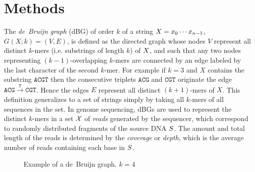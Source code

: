 \documentclass[a4paper,12pt]{article}
\newcommand{\dBG}{de~Bruijn graph\xspace}
\newcommand{\kmer}{\mbox{$k$-mer}\xspace}
\newcommand{\kmers}{\mbox{$k$-mers}\xspace}
\newcommand{\chr}[1]{\ensuremath{\mathtt{#1}}}
\newcommand{\keyterm}[1]{\textit{#1}\/\xspace}
\newcommand{\str}[2]{\ensuremath{#1_0\cdots#1_{#2-1}}}
\newcommand{\strname}[1]{\ensuremath{\uppercase{#1}}}
\newcommand{\strdef}[2]{\ensuremath{\strname{#1}=\str{#1}{#2}}}
\newcommand{\strsetname}[1]{\ensuremath{\mathcal{\uppercase{#1}}}}
\newcommand{\readset}{\strsetname{X}\xspace}
\begin{document}
\section{Methods}

The \keyterm{\dBG} (dBG) of order $k$ of a string \strdef{x}{n}, $G(X;k)=(V,E)$, is defined as the directed graph whose nodes $V$ represent all distinct \kmer{s} (i.e. substrings of length $k$) of \strname{X}, and such that any two nodes representing $(k-1)$-overlapping \kmer{s} are connected by an edge labeled by the last character of the second \kmer. For example if $k=3$ and $X$ contains the substring \chr{ACGT} then the consecutive triplets \chr{ACG} and \chr{CGT} originate the edge $\chr{ACG}\stackrel{\chr{T}}{\longrightarrow}\chr{CGT}$. Hence the edges $E$ represent all distinct $(k+1)$-mers of $X$. This definition  generalizes to a set of strings simply by taking all \kmers of all sequences in the set.
In genome sequencing, dBGs are used to represent the distinct \kmer{s} in a set \readset of \keyterm{reads} generated by the sequencer, which correspond to randomly distributed fragments of the source DNA \strname{S}. The amount and total length of the reads is determined by the \keyterm{coverage} or \keyterm{depth}, which is the average number of reads containing each base in \strname{S}. 

\begin{figure}[htbp]
	\begin{center}
	\end{center}
	\caption{Example of a \dBG. $k=4$}\label{fig:dbgexample}
\end{figure}

\end{document}
